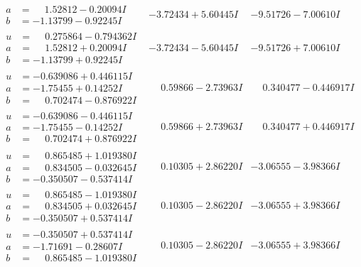 \documentclass[1p]{elsarticle_modified}
\theoremstyle{definition}
\begin{document}
$$\begin{array}{c|c|c}
\begin{aligned}
a &= \phantom{-}1.52812 - 0.20094 I \\
b &= -1.13799 - 0.92245 I\end{aligned}
 & -3.72434 + 5.60445 I & -9.51726 - 7.00610 I \\ \hline\begin{aligned}
u &= \phantom{-}0.275864 - 0.794362 I \\
a &= \phantom{-}1.52812 + 0.20094 I \\
b &= -1.13799 + 0.92245 I\end{aligned}
 & -3.72434 - 5.60445 I & -9.51726 + 7.00610 I \\ \hline\begin{aligned}
u &= -0.639086 + 0.446115 I \\
a &= -1.75455 + 0.14252 I \\
b &= \phantom{-}0.702474 - 0.876922 I\end{aligned}
 & \phantom{-}0.59866 - 2.73963 I & \phantom{-}0.340477 - 0.446917 I \\ \hline\begin{aligned}
u &= -0.639086 - 0.446115 I \\
a &= -1.75455 - 0.14252 I \\
b &= \phantom{-}0.702474 + 0.876922 I\end{aligned}
 & \phantom{-}0.59866 + 2.73963 I & \phantom{-}0.340477 + 0.446917 I \\ \hline\begin{aligned}
u &= \phantom{-}0.865485 + 1.019380 I \\
a &= \phantom{-}0.834505 - 0.032645 I \\
b &= -0.350507 - 0.537414 I\end{aligned}
 & \phantom{-}0.10305 + 2.86220 I & -3.06555 - 3.98366 I \\ \hline\begin{aligned}
u &= \phantom{-}0.865485 - 1.019380 I \\
a &= \phantom{-}0.834505 + 0.032645 I \\
b &= -0.350507 + 0.537414 I\end{aligned}
 & \phantom{-}0.10305 - 2.86220 I & -3.06555 + 3.98366 I \\ \hline\begin{aligned}
u &= -0.350507 + 0.537414 I \\
a &= -1.71691 - 0.28607 I \\
b &= \phantom{-}0.865485 - 1.019380 I\end{aligned}
 & \phantom{-}0.10305 - 2.86220 I & -3.06555 + 3.98366 I \\ \hline\begin{aligned}

\end{aligned}
\end{array}$$
\end{document}
